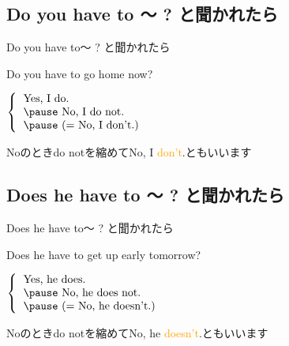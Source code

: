 \documentclass[aspectratio=169,xcolor={dvipsnames,table}]{beamer}
\begin{document}
\subsection{Do you have to 〜 ? と聞かれたら}
 \begin{frame}[plain]{Do you have to〜 ? と聞かれたら}
 \Large
\pause

Do you have to go home now?

\vspace{20pt}
\pause

\mbox{}\hspace{100pt}$\left\{\begin{tabular}{l}
         \text{Yes, I do.}\\\pause
         \text{No, I do not.}\\\pause
         \text{(}= \text{No, I don't.)}
        \end{tabular}\right.$

\pause

\mbox{}\hfill{}{\small Noのときdo notを縮めてNo, I \textcolor{orange}{don't}.ともいいます}

\end{frame}

\subsection{Does he  have to 〜 ? と聞かれたら}
 \begin{frame}[plain]{Does he have to〜 ? と聞かれたら}
 \Large
\pause

Does he  have to get up early tomorrow?

\vspace{20pt}
\pause

\mbox{}\hspace{100pt}$\left\{\begin{tabular}{l}
         \text{Yes, he does.}\\\pause
         \text{No, he does not.}\\\pause
         \text{(}= \text{No, he doesn't.)}
        \end{tabular}\right.$

\pause

\mbox{}\hfill{}{\small Noのときdo notを縮めてNo, he \textcolor{orange}{doesn't}.ともいいます}

\end{frame}
\end{document}

